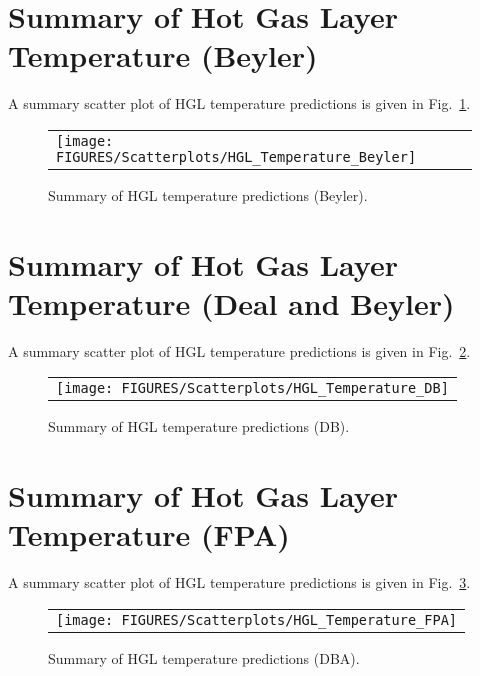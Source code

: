 \clearpage


\section{Summary of Hot Gas Layer Temperature (Beyler)}

A summary scatter plot of HGL temperature predictions is given in Fig.~\ref{hgl_temperature_beyler_summary}. 

\begin{figure}[ht]
\begin{center}
\begin{tabular}{l}
\texttt{[image: FIGURES/Scatterplots/HGL\_Temperature\_Beyler]}
\end{tabular}
\end{center}
\caption[Summary of HGL temperature predictions (Beyler).]
{Summary of HGL temperature predictions (Beyler).}
\label{hgl_temperature_beyler_summary}
\end{figure}


\clearpage


\section{Summary of Hot Gas Layer Temperature (Deal and Beyler)}

A summary scatter plot of HGL temperature predictions is given in Fig.~\ref{hgl_temperature_DB_summary}. 

\begin{figure}[ht]
\begin{center}
\begin{tabular}{l}
\texttt{[image: FIGURES/Scatterplots/HGL\_Temperature\_DB]}
\end{tabular}
\end{center}
\caption[Summary of HGL temperature predictions (DB).]
{Summary of HGL temperature predictions (DB).}
\label{hgl_temperature_DB_summary}
\end{figure}


\clearpage


\section{Summary of Hot Gas Layer Temperature (FPA)}

A summary scatter plot of HGL temperature predictions is given in Fig.~\ref{hgl_temperature_FPA_summary}. 

\begin{figure}[ht]
\begin{center}
\begin{tabular}{l}
\texttt{[image: FIGURES/Scatterplots/HGL\_Temperature\_FPA]}
\end{tabular}
\end{center}
\caption[Summary of HGL temperature predictions (DBA).]
{Summary of HGL temperature predictions (DBA).}
\label{hgl_temperature_FPA_summary}
\end{figure}


